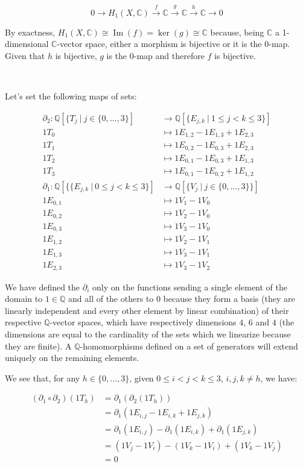\documentclass{article}
\newcommand{\numberset}{\mathbb}
\newcommand{\Q}{\numberset{Q}}
\newcommand{\C}{\numberset{C}}
\DeclareMathOperator{\Ima}{Im}
\newcommand{\exercise}[1]{\noindent {\bf Exercise #1}}
\begin{document}
$$0\rightarrow H_1(X,\C)\xrightarrow{f}\C\xrightarrow{g}\C\xrightarrow{h}\C\rightarrow 0$$

By exactness, $H_1(X,\C)\cong\Ima(f)=\ker(g)\cong\C$ because, being $\C$ a 1-dimensional $\C$-vector space, either a morphism is bijective or it is the 0-map. Given that $h$ is bijective, $g$ is the 0-map and therefore $f$ is bijective.




~\\
\exercise{2.4}

Let's set the following maps of sets:

\begin{align*}
		\partial_2 : \Q[\{T_j\ |\ j\in\{0,\ldots,3\}] & \rightarrow \Q[\{E_{j,k}\ |\ 1\leq j<k\leq 3\}] \\
			1T_0 & \mapsto 1E_{1,2}-1E_{1,3}+1E_{2,3} \\
			1T_1 & \mapsto 1E_{0,2}-1E_{0,3}+1E_{2,3} \\
			1T_2 & \mapsto 1E_{0,1}-1E_{0,3}+1E_{1,3} \\
			1T_3 & \mapsto 1E_{0,1}-1E_{0,2}+1E_{1,2} \\
		\partial_1 : \Q[\{\{E_{j,k}\ |\ 0\leq j<k\leq 3\}] & \rightarrow \Q[\{V_j\ |\ j\in\{0,\ldots,3\}\}] \\
			1E_{0,1} & \mapsto 1V_1-1V_0 \\
			1E_{0,2} & \mapsto 1V_2-1V_0 \\
			1E_{0,3} & \mapsto 1V_3-1V_0 \\
			1E_{1,2} & \mapsto 1V_2-1V_1 \\
			1E_{1,3} & \mapsto 1V_3-1V_1 \\
			1E_{2,3} & \mapsto 1V_3-1V_2
\end{align*}

We have defined the $\partial_i$ only on the functions sending a single element of the domain to $1\in\Q$ and all of the others to 0 because they form a basis (they are linearly independent and every other element by linear combination) of their respective $\Q$-vector spaces, which have respectively dimensions $4$, $6$ and $4$ (the dimensions are equal to the cardinality of the sets which we linearize because they are finite). A $\Q$-homomorphisms defined on a set of generators will extend uniquely on the remaining elements.

We see that, for any $h\in\{0,\ldots,3\}$, given $0\leq i<j<k\leq 3$, $i,j,k\neq h$, we have:

\begin{align*}
		(\partial_1\circ\partial_2)(1T_h) & = \partial_1(\partial_2(1T_h)) \\
		& = \partial_1(1E_{i,j}-1E_{i,k}+1E_{j,k}) \\
		& = \partial_1(1E_{i,j})-\partial_1(1E_{i,k})+\partial_1(1E_{j,k}) \\
		& = (1V_j-1V_i)-(1V_k-1V_i)+(1V_k-1V_j) \\
		& = 0
\end{align*}
\end{document}
